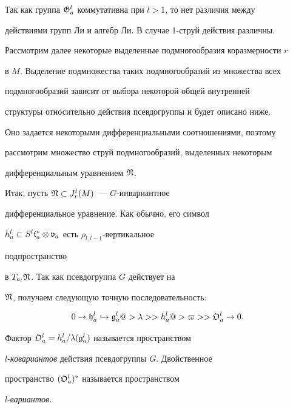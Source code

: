 \begin{note}\label{rk1}


Так как группа $\frak{G}^l_a$ коммутативна при $l>1$, то нет различия между


действиями групп Ли и алгебр Ли. В случае 1-струй действия различны.


\end{note}





Рассмотрим далее некоторые выделенные подмногообразия коразмерности  $r$


в $M$. Выделение подмножества таких подмногообразий из множества всех


подмногообразий зависит от выбора некоторой общей внутренней


структуры относительно действия псевдогруппы и будет описано ниже.


Оно задается некоторыми дифференциальными соотношениями, поэтому


рассмотрим множество струй подмногообразий, выделенных некоторым


дифференциальным уравнением $\frak{N}$.





Итак, пусть $\frak{N}\subset J^l_r(M)$~--- $G$-инвариантное


дифференциальное уравнение. Как обычно, его символ


$h_a^l\subset S^l{\frak t}^*_a\otimes{\frak v}_a$ есть $\rho_{l,l-1}$-вертикальное


подпространство


в $T_{a_l}\frak{N}$. Так как псевдогруппа $G$ действует на


$\frak{N}$, получаем следующую точную последовательность:


\begin{equation}\label{130300}


0\to{\frak h}^l_a\hookrightarrow


\g^l_a@>{\ll}>> h_a^l@>{\varpi}>> {\frak O}^l_a\to 0.


\end{equation}





\begin{defn}


Фактор ${\frak O}^l_a=h_a^l/\lambda({\frak g}^l_a)$ называется пространством


$l$-{\em ковариантов\/} действия псевдогруппы $G$. Двойственное


пространство $({\frak O}^l_a)^*$ называется пространством


$l$-{\em вариантов}.


\end{defn}





